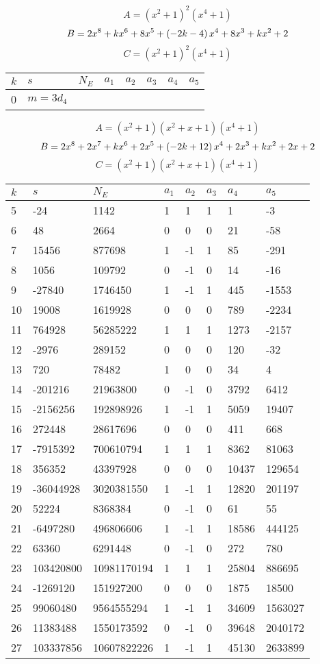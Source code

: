 \documentclass{amsart}
\begin{document}
$$A=(x^2
 + 1)^{2}(x^4
 + 1)$$
$$B=2\*x^8
 + k\*x^6
 + 8\*x^5
 + \left(-2\*k
 - 4\right) \*x^4
 + 8\*x^3
 + k\*x^2
 + 2$$
$$C=(x^2
 + 1)^{2}(x^4
 + 1)$$
\begin{longtable}{|l|l|l|lllll|}
\hline
$k$ & $s$ & $N_E$ & $a_1$ & $a_2$ & $a_3$ & $a_4$ & $a_5$\\
\hline
0&$m=3d_{4}$&&\multicolumn{5}{c|}{}\\
\hline
\end{longtable}
$$A=(x^2
 + 1)(x^2
 + x
 + 1)(x^4
 + 1)$$
$$B=2\*x^8
 + 2\*x^7
 + k\*x^6
 + 2\*x^5
 + \left(-2\*k
 + 12\right) \*x^4
 + 2\*x^3
 + k\*x^2
 + 2\*x
 + 2$$
$$C=(x^2
 + 1)(x^2
 + x
 + 1)(x^4
 + 1)$$
\begin{longtable}{|l|l|l|lllll|}
\hline
$k$ & $s$ & $N_E$ & $a_1$ & $a_2$ & $a_3$ & $a_4$ & $a_5$\\
\hline
5&-24&1142&1&1&1&1&-3\\
6&48&2664&0&0&0&21&-58\\
7&15456&877698&1&-1&1&85&-291\\
8&1056&109792&0&-1&0&14&-16\\
9&-27840&1746450&1&-1&1&445&-1553\\
10&19008&1619928&0&0&0&789&-2234\\
11&764928&56285222&1&1&1&1273&-2157\\
12&-2976&289152&0&0&0&120&-32\\
13&720&78482&1&0&0&34&4\\
14&-201216&21963800&0&-1&0&3792&6412\\
15&-2156256&192898926&1&-1&1&5059&19407\\
16&272448&28617696&0&0&0&411&668\\
17&-7915392&700610794&1&1&1&8362&81063\\
18&356352&43397928&0&0&0&10437&129654\\
19&-36044928&3020381550&1&-1&1&12820&201197\\
20&52224&8368384&0&-1&0&61&55\\
21&-6497280&496806606&1&-1&1&18586&444125\\
22&63360&6291448&0&-1&0&272&780\\
23&103420800&10981170194&1&1&1&25804&886695\\
24&-1269120&151927200&0&0&0&1875&18500\\
25&99060480&9564555294&1&-1&1&34609&1563027\\
26&11383488&1550173592&0&-1&0&39648&2040172\\
27&103337856&10607822226&1&-1&1&45130&2633899\\

\end{longtable}
\end{document}
